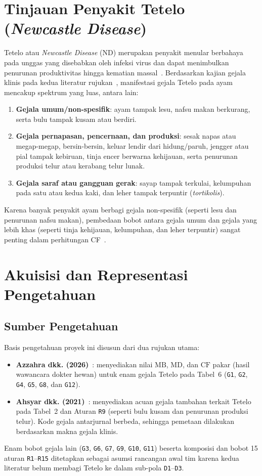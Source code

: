 \documentclass[12pt,a4paper]{report}
\begin{document}
\section{Tinjauan Penyakit Tetelo (\textit{Newcastle Disease})}
Tetelo atau \textit{Newcastle Disease} (ND) merupakan penyakit menular berbahaya pada unggas yang disebabkan oleh infeksi virus dan dapat menimbulkan penurunan produktivitas hingga kematian massal~\cite{azzahra2026,ahsyar2021}. Berdasarkan kajian gejala klinis pada kedua literatur rujukan~\cite{azzahra2026,ahsyar2021}, manifestasi gejala Tetelo pada ayam mencakup spektrum yang luas, antara lain:
\begin{enumerate}
  \item \textbf{Gejala umum/non-spesifik}: ayam tampak lesu, nafsu makan berkurang, serta bulu tampak kusam atau berdiri.
  \item \textbf{Gejala pernapasan, pencernaan, dan produksi}: sesak napas atau megap-megap, bersin-bersin, keluar lendir dari hidung/paruh, jengger atau pial tampak kebiruan, tinja encer berwarna kehijauan, serta penurunan produksi telur atau kerabang telur lunak.
  \item \textbf{Gejala saraf atau gangguan gerak}: sayap tampak terkulai, kelumpuhan pada satu atau kedua kaki, dan leher tampak terpuntir (\textit{tortikolis}).
\end{enumerate}

Karena banyak penyakit ayam berbagi gejala non-spesifik (seperti lesu dan penurunan nafsu makan), pembedaan bobot antara gejala umum dan gejala yang lebih khas (seperti tinja kehijauan, kelumpuhan, dan leher terpuntir) sangat penting dalam perhitungan CF~\cite{azzahra2026}.

\section{Akuisisi dan Representasi Pengetahuan}

\subsection{Sumber Pengetahuan}
Basis pengetahuan proyek ini disusun dari dua rujukan utama:
\begin{itemize}
  \item \textbf{Azzahra dkk. (2026)}~\cite{azzahra2026}: menyediakan nilai $\text{MB}$, $\text{MD}$, dan $\text{CF}$ pakar (hasil wawancara dokter hewan) untuk enam gejala Tetelo pada Tabel~6 (\texttt{G1}, \texttt{G2}, \texttt{G4}, \texttt{G5}, \texttt{G8}, dan \texttt{G12}).
  \item \textbf{Ahsyar dkk. (2021)}~\cite{ahsyar2021}: menyediakan acuan gejala tambahan terkait Tetelo pada Tabel~2 dan Aturan \texttt{R9} (seperti bulu kusam dan penurunan produksi telur). Kode gejala antarjurnal berbeda, sehingga pemetaan dilakukan berdasarkan makna gejala klinis.
\end{itemize}
Enam bobot gejala lain (\texttt{G3}, \texttt{G6}, \texttt{G7}, \texttt{G9}, \texttt{G10}, \texttt{G11}) beserta komposisi dan bobot 15 aturan \texttt{R1}--\texttt{R15} ditetapkan sebagai asumsi rancangan awal tim karena kedua literatur belum membagi Tetelo ke dalam sub-pola \texttt{D1}--\texttt{D3}.
\end{document}
